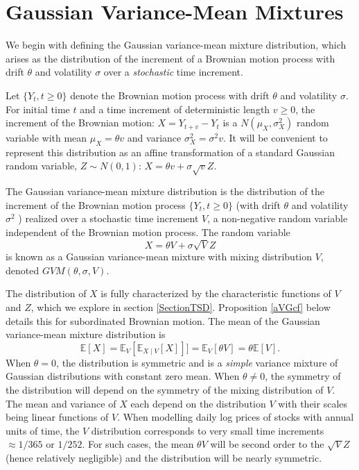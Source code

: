 \documentclass{article}
\begin{document}
\section{Gaussian Variance-Mean Mixtures}\label{SectionGVMM}
We begin with defining the Gaussian variance-mean mixture distribution, which arises as the distribution of the increment of a Brownian motion process with drift $\theta$ and volatility $\sigma$  over a \textit{stochastic} time increment.

Let $\{Y_t ,  t\geq 0\}$ denote the Brownian motion process with drift $\theta$ and volatility $\sigma$.  For initial time $t$ and a time increment of deterministic length $v\geq0$, the increment  of the Brownian motion:
$ X = Y_{t+v} - Y_t$
is a $ N(\mu_X,\sigma_X^2)$ random variable with mean $\mu_X=\theta v$ and variance $\sigma_X^2 = \sigma^2 v.$  It will be convenient to represent this distribution as an affine transformation of a standard Gaussian random variable, $Z \sim N(0,1)$:
$ X = \theta v + \sigma \sqrt{v} Z.$

\begin{definition}\label{defvariancemeanmix}

The Gaussian variance-mean mixture distribution is the distribution of the increment of the Brownian motion process $\{Y_t, t \geq 0 \}$ (with drift $\theta$ and volatility $\sigma^2$ ) realized over a stochastic time increment $V$, a non-negative random variable independent of the Brownian motion process. The random variable 
\begin{equation}\label{variancemeanmix}
        X =  \theta V + \sigma \sqrt{V}Z
    \end{equation}
    is known as a Gaussian variance-mean mixture with mixing distribution $V$, denoted $GVM(\theta, \sigma, V).$
\end{definition}

The distribution of $X$ is fully characterized by the characteristic functions of $V$ and $Z$, which we explore in section \ref{SectionTSD}.  Proposition \ref{aVGcf} below details this for subordinated Brownian motion. The mean of the Gaussian variance-mean mixture  distribution is
$$\mathbb{E}[X] = \mathbb{E}_V [ \mathbb{E}_{X \mid V} [X]]] = \mathbb{E}_V[ \theta V] = \theta \mathbb{E}[V].$$
When $\theta=0$, the distribution is symmetric and is a {\it simple} variance mixture of Gaussian distributions with constant zero mean.  When $\theta \not = 0$, the symmetry of the distribution will depend on the symmetry of the mixing distribution of $V$. The mean and variance of $X$  each depend  on the distribution $V$ with their scales being linear functions of $V.$ When modelling daily log prices of stocks with annual units of time, the $V$ distribution corresponds to very small time increments $\approx 1/365$  or $1/252$. For such cases, the mean $ \theta V$ will be second order to the $\sqrt{V}Z$ (hence relatively negligible) and the distribution will be nearly symmetric. 
 
\end{document}
